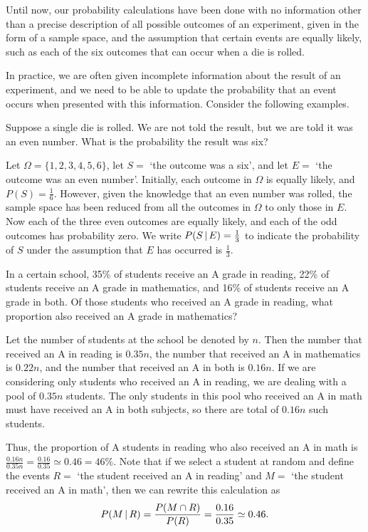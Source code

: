 Until now, our probability calculations have been done with no information other than a precise description of all possible outcomes of an experiment, given in the form of a sample space, and the assumption that certain events are equally likely, such as each of the six outcomes that can occur when a die is rolled.
\par
In practice, we are often given incomplete information about the result of an experiment, and we need to be able to update the probability that an event occurs when presented with this information. Consider the following examples.
\par
\begin{examp}Suppose a single die is rolled. We are not told the result, but we are told it was an even number. What is the probability the result was six? 
\par
Let $\Omega = \{1,2,3,4,5,6\}$, let $S =$ `the outcome was a six', and let $E =$ `the outcome was an even number'. Initially, each outcome in $\Omega$ is equally likely, and $P(S) = \frac{1}{6}$. However, given the knowledge that an even number was rolled, the sample space has been reduced from all the outcomes in $\Omega$ to only those in $E$. Now each of the three even outcomes are equally likely, and each of the odd outcomes has probability zero. We write $P(S \,|\, E) = \frac{1}{3}$ to indicate the probability of $S$ under the assumption that $E$ has occurred is $\frac{1}{3}$.
\end{examp}
\begin{examp} In a certain school, 35\% of students receive an A grade in reading, 22\% of students receive an A grade in mathematics, and 16\% of students receive an A grade in both. Of those students who received an A grade in reading, what proportion also received an A grade in mathematics?
\par
\noindent Let the number of students at the school be denoted by $n$. Then the number that received an A in reading is $0.35n$, the number that received an A in mathematics is $0.22n$, and the number that received an A in both is $0.16n$. If we are considering only students who received an A in reading, we are dealing with a pool of $0.35n$ students. The only students in this pool who received an A in math must have received an A in both subjects, so there are total of $0.16n$ such students.
\par
\noindent Thus, the proportion of A students in reading who also received an A in math is $\frac{0.16n}{0.35n} = \frac{0.16}{0.35} \simeq 0.46 = 46\%$. Note that if we select a student at random and define the events $R =$ `the student received an A in reading' and $M =$ `the student received an A in math', then we can rewrite this calculation as
$$P(M \,|\, R) = \frac{P(M \cap R)}{P(R)} = \frac{0.16}{0.35} \simeq 0.46.$$
\end{examp}
